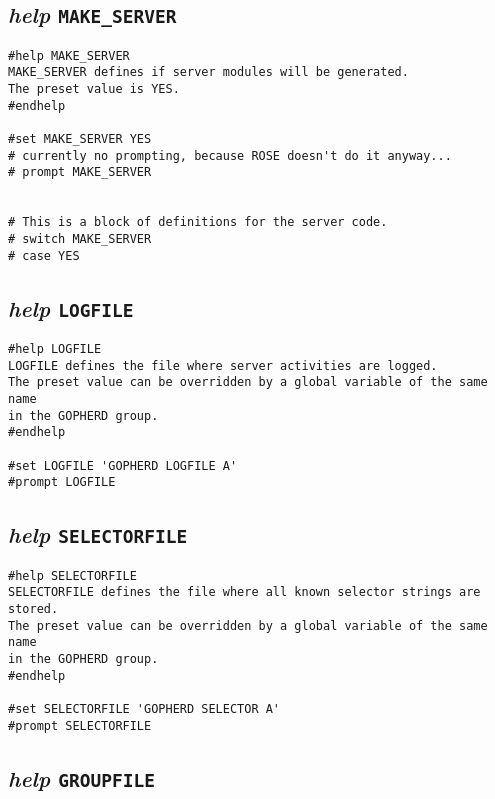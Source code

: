 \subsection{{\sl{help}} {\tt MAKE\_SERVER}}

\def\LPtopD{{\sl{help}} {\tt MAKE\_SERVER}}

\def\LPtopF{~}

\begin{verbatim}
#help MAKE_SERVER
MAKE_SERVER defines if server modules will be generated.
The preset value is YES.
#endhelp

#set MAKE_SERVER YES
# currently no prompting, because ROSE doesn't do it anyway...
# prompt MAKE_SERVER


# This is a block of definitions for the server code.
# switch MAKE_SERVER
# case YES
\end{verbatim}

\subsection{{\sl{help}} {\tt LOGFILE}}

\def\LPtopD{{\sl{help}} {\tt LOGFILE}}

\def\LPtopF{~}

\begin{verbatim}
#help LOGFILE
LOGFILE defines the file where server activities are logged.
The preset value can be overridden by a global variable of the same name
in the GOPHERD group.
#endhelp

#set LOGFILE 'GOPHERD LOGFILE A'
#prompt LOGFILE
\end{verbatim}

\subsection{{\sl{help}} {\tt SELECTORFILE}}

\def\LPtopD{{\sl{help}} {\tt SELECTORFILE}}

\def\LPtopF{~}

\begin{verbatim}
#help SELECTORFILE
SELECTORFILE defines the file where all known selector strings are stored.
The preset value can be overridden by a global variable of the same name
in the GOPHERD group.
#endhelp

#set SELECTORFILE 'GOPHERD SELECTOR A'
#prompt SELECTORFILE
\end{verbatim}

\subsection{{\sl{help}} {\tt GROUPFILE}}

